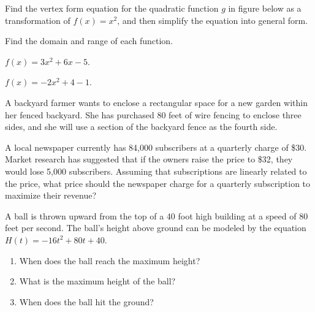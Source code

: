 \begin{example}
 Find the vertex form equation for the quadratic function $g$ in figure below as a transformation of $f(x)=x^2$, and then simplify the equation into general form.

\end{example}
\vspace*{-0.2\textheight}

\begin{example}
  Find the domain and range of each function.\\
  \begin{enumerate*}
    \item $f(x)=3x^2+6x-5$.
    \item $f(x)=-2x^2+4-1$.\hfill\null
  \end{enumerate*}
\end{example}

\begin{example}
  A backyard farmer wants to enclose a rectangular space for a new garden within her fenced backyard. She has purchased 80 feet of wire fencing to enclose three sides, and she will use a section of the backyard fence as the fourth side.
\end{example}

\newpage

\begin{example}
  A local newspaper currently has 84,000 subscribers at a quarterly charge of \$30. Market research has suggested that if the owners raise the price to \$32, they would lose 5,000 subscribers. Assuming that subscriptions are linearly related to the price, what price should the newspaper charge for a quarterly subscription to maximize their revenue?
\end{example}

\begin{example}
  A ball is thrown upward from the top of a 40 foot high building at a speed of 80 feet per second. The ball's height above ground can be modeled by the equation \(H(t)=-16t^2+80t+40\).
\begin{enumerate}
  \item When does the ball reach the maximum height?
  \item What is the maximum height of the ball?  
  \item When does the ball hit the ground?
\end{enumerate}
\end{example}

